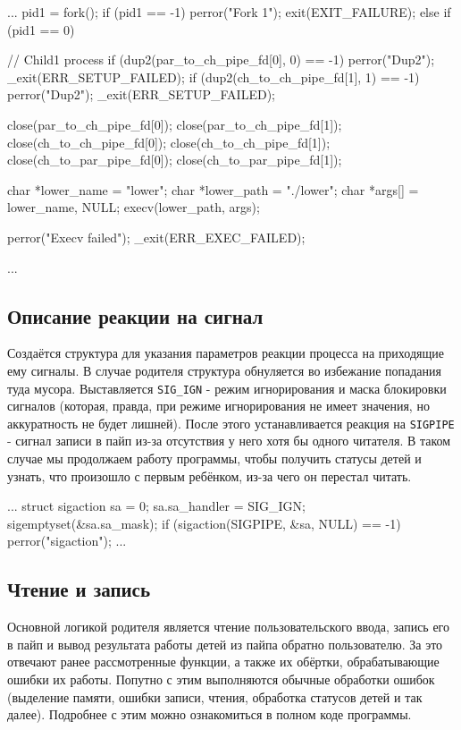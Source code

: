 \documentclass[a4paper,12pt]{article}
\begin{document}
\begin{codeblock}
...
pid1 = fork();
if (pid1 == -1) {
    perror("Fork 1");
    exit(EXIT_FAILURE);
}
else if (pid1 == 0) {
    // Child1 process
    if (dup2(par_to_ch_pipe_fd[0], 0) == -1) {
        perror("Dup2");
        _exit(ERR_SETUP_FAILED);
    }
    if (dup2(ch_to_ch_pipe_fd[1], 1) == -1) {
        perror("Dup2");
        _exit(ERR_SETUP_FAILED);
    }

    close(par_to_ch_pipe_fd[0]); close(par_to_ch_pipe_fd[1]);
    close(ch_to_ch_pipe_fd[0]); close(ch_to_ch_pipe_fd[1]);
    close(ch_to_par_pipe_fd[0]); close(ch_to_par_pipe_fd[1]);

    char *lower_name = "lower";
    char *lower_path = "./lower";
    char *args[] = {lower_name, NULL};
    execv(lower_path, args);

    perror("Execv failed");
    _exit(ERR_EXEC_FAILED);
}
...
\end{codeblock}


\subsection{Описание реакции на сигнал}

Создаётся структура для указания параметров реакции процесса на приходящие ему сигналы. В случае родителя структура обнуляется во избежание попадания туда мусора. Выставляется \texttt{SIG\_IGN} - режим игнорирования и маска блокировки сигналов (которая, правда, при режиме игнорирования не имеет значения, но аккуратность не будет лишней). После этого устанавливается реакция на \texttt{SIGPIPE} - сигнал записи в пайп из-за отсутствия у него хотя бы одного читателя. В таком случае мы продолжаем работу программы, чтобы получить статусы детей и узнать, что произошло с первым ребёнком, из-за чего он перестал читать.

\begin{codeblock}
...
struct sigaction sa = {0};
sa.sa_handler = SIG_IGN;
sigemptyset(&sa.sa_mask);
if (sigaction(SIGPIPE, &sa, NULL) == -1) {
    perror("sigaction");
}
...
\end{codeblock}


\subsection{Чтение и запись}

Основной логикой родителя является чтение пользовательского ввода, запись его в пайп и вывод результата работы детей из пайпа обратно пользователю. За это отвечают ранее рассмотренные функции, а также их обёртки, обрабатывающие ошибки их работы. Попутно с этим выполняются обычные обработки ошибок (выделение памяти, ошибки записи, чтения, обработка статусов детей и так далее). Подробнее с этим можно ознакомиться в полном коде программы.
\end{document}
